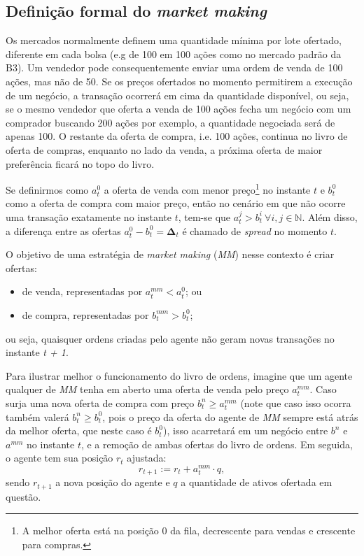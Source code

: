 \subsection{Definição formal do \textit{market making}}

Os mercados normalmente definem uma quantidade mínima por lote ofertado, diferente em cada bolsa (e.g de 100 em 100 ações como no mercado padrão da B3). Um vendedor pode consequentemente enviar uma ordem de venda de 100 ações, mas não de 50. Se os preços ofertados no momento permitirem a execução de um negócio, a transação ocorrerá em cima da quantidade disponível, ou seja, se o mesmo vendedor que oferta a venda de 100 ações fecha um negócio com um comprador buscando 200 ações por exemplo, a quantidade negociada será de apenas 100. O restante da oferta de compra, i.e. 100 ações, continua no livro de oferta de compras, enquanto no lado da venda, a próxima oferta de maior preferência ficará no topo do livro. 

Se definirmos como $a^{0}_{t}$ a oferta de venda com menor preço\footnote{A melhor oferta está na posição 0 da fila, decrescente para vendas e crescente para compras.} no instante $t$ e $b^{0}_{t}$ como a oferta de compra com maior preço, então no cenário em que não ocorre uma transação exatamente no instante $t$, tem-se que $a^{j}_{t} > b^{i}_{t} \ \forall i ,j \in \mathbb{N}$. Além disso, a diferença entre as ofertas $a^{0}_{t} - b^{0}_{t} = \mathbf{\Delta}_t$ é chamado de \textit{spread} no momento $t$.

O objetivo de uma estratégia de \textit{market making} (\textit{MM}) nesse contexto é criar ofertas: 

\begin{itemize}
    \item de venda, representadas por $a^{mm}_{t} < a^{0}_{t}$; ou 
    \item de compra, representadas por $b^{mm}_{t} > b^{0}_{t}$;
\end{itemize}
ou seja, quaisquer ordens criadas pelo agente não geram novas transações no instante \textit{t + 1}.

Para ilustrar melhor o funcionamento do livro de ordens, imagine que um agente qualquer de \textit{MM} tenha em aberto uma oferta de venda pelo preço $a^{mm}_{t}$. Caso surja uma nova oferta de compra com preço $b^{n}_{t} \geq a^{mm}_{t}$ (note que caso isso ocorra também valerá $b^{n}_{t} \geq b^{0}_{t}$, pois o preço da oferta do agente de \textit{MM} sempre está atrás da melhor oferta, que neste caso é $b_{t}^{0}$), isso acarretará em um negócio entre $b^{n}$ e $a^{mm}$ no instante $t$, e a remoção de ambas ofertas do livro de ordens. Em seguida, o agente tem sua posição $r_{t}$ ajustada:
\begin{equation}
    r_{t + 1}:= r_{t} + a^{mm}_{t}\cdot q,
\end{equation}
sendo $r_{t + 1}$ a nova posição do agente e $q$ a quantidade de ativos ofertada em questão.

